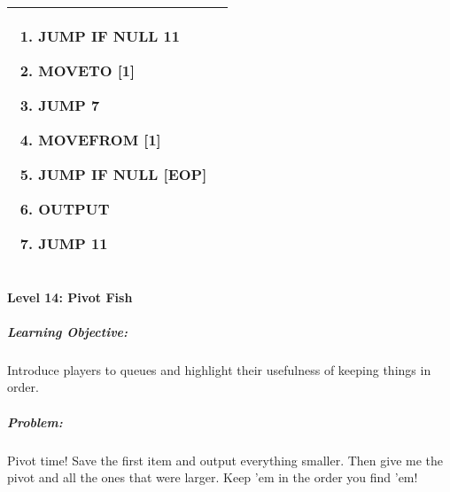 \begin{center}
\begin{tabular}{ | m{5cm} | m{9cm} | }
\begin{enumerate}
                \item JUMP IF NULL 11
                \item MOVETO [1]
                \item JUMP 7
                \item MOVEFROM [1]
                \item JUMP IF NULL [EOP]
                \item OUTPUT
                \item JUMP 11
            \end{enumerate}
            \\
        \hline
    \end{tabular}
\end{center}


\paragraph{Level 14: Pivot Fish}
\subparagraph{Learning Objective:} Introduce players to queues and highlight their usefulness of keeping things in order.

\subparagraph{Problem:} Pivot time! Save the first item and output everything smaller. Then give me the pivot and all the ones that were larger. Keep 'em in the order you find 'em!

